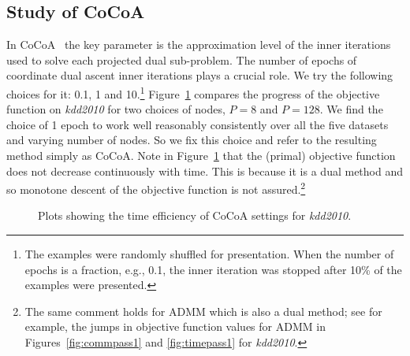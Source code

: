 \documentclass[twoside, 11pt]{article}
\begin{document}
\subsection{Study of CoCoA}
\label{subsec:dbca}

In CoCoA~\citep{jaggi2014} the key parameter is the approximation level of the inner iterations used to solve each projected dual sub-problem. The number of epochs of coordinate dual ascent inner iterations plays a crucial role. We try the following choices for it: 0.1, 1 and 10.\footnote{The examples were randomly shuffled for presentation. When the number of epochs is a fraction, e.g., 0.1, the inner iteration was stopped after 10\% of the examples were presented.} Figure~\ref{fig:cocoa} compares the progress of the objective function on {\it kdd2010} for two choices of nodes, $P=8$ and $P=128$. We find the choice of 1 epoch to work well reasonably consistently over all the five datasets and varying number of nodes. So we fix this choice and refer to the resulting method simply as CoCoA. Note in Figure~\ref{fig:cocoa} that the (primal) objective function does not decrease continuously with time. This is because it is a dual method and so monotone descent of the objective function is not assured.\footnote{The same comment holds for ADMM which is also a dual method; see for example, the jumps in objective function values for ADMM in Figures~\ref{fig:commpass1} and \ref{fig:timepass1} for {\it kdd2010}.}

\begin{figure}[t]
\centering
{}
\caption{Plots showing the time efficiency of CoCoA settings for {\it kdd2010}.}
\label{fig:cocoa}
\end{figure}
\end{document}
